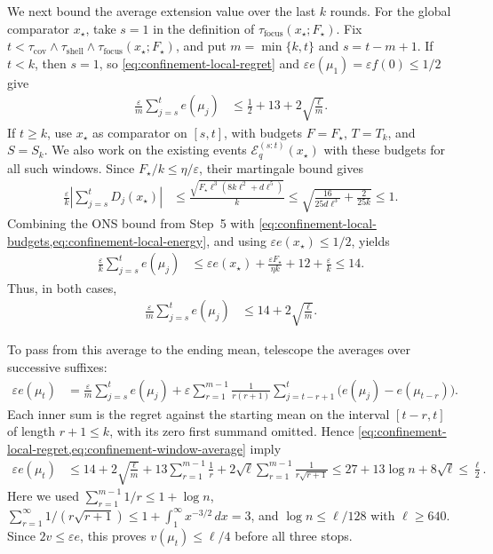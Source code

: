 \documentclass{article}
\newcommand{\1}{\mathbf 1}
\newcommand{\eps}{\varepsilon}
\begin{document}
We next bound the average extension value over the last $k$ rounds.
For the global comparator $x_\star$, take $s=1$ in the definition of
$\tau_{\mathrm{focus}}(x_\star;F_\star)$.
Fix $t<\tau_{\mathrm{cov}}\wedge\tau_{\mathrm{shell}}
    \wedge\tau_{\mathrm{focus}}(x_\star;F_\star)$, and put
$m=\min\{k,t\}$ and $s=t-m+1$.
If $t<k$, then $s=1$, so \eqref{eq:confinement-local-regret} and
$\eps e(\mu_1)=\eps f(0)\leq1/2$ give
\begin{align}
    \frac{\eps}{m}\sum_{j=s}^{t}e(\mu_j)
     & \leq\frac12+13+2\sqrt{\frac{\ell}{m}}.
\end{align}
If $t\geq k$, use $x_\star$ as comparator on $[s,t]$, with budgets
$F=F_\star$, $T=T_k$, and $S=S_k$.
We also work on the existing events
$\mathcal E_{q}^{(s:t)}(x_\star)$ with these budgets for all such windows.
Since $F_\star/k\leq\eta/\eps$, their martingale bound gives
\begin{align}
    \frac{\eps}{k}\left|\sum_{j=s}^{t}D_j(x_\star)\right|
     & \leq\frac{\sqrt{F_\star\ell^3(8k\ell^2+d\ell^5)}}{k}
    \leq\sqrt{\frac{16}{25d\ell^3}+\frac{2}{25k}}
    \leq1.
\end{align}
Combining the ONS bound from Step~5 with
\cref{eq:confinement-local-budgets,eq:confinement-local-energy}, and using
$\eps e(x_\star)\leq1/2$, yields
\begin{align}
    \frac{\eps}{k}\sum_{j=s}^{t}e(\mu_j)
     & \leq\eps e(x_\star)+\frac{\eps F_\star}{\eta k}
    +12+\frac{\eps}{k}
    \leq14.
\end{align}
Thus, in both cases,
\begin{align}
    \frac{\eps}{m}\sum_{j=s}^{t}e(\mu_j)
     & \leq14+2\sqrt{\frac{\ell}{m}}.
    \label{eq:confinement-window-average}
\end{align}

To pass from this average to the ending mean, telescope the averages
over successive suffixes:
\begin{align}
    \eps e(\mu_t)
     & =\frac{\eps}{m}\sum_{j=s}^{t}e(\mu_j)
    +\eps\sum_{r=1}^{m-1}\frac{1}{r(r+1)}
    \sum_{j=t-r+1}^{t}\bigl(e(\mu_j)-e(\mu_{t-r})\bigr).
\end{align}
Each inner sum is the regret against the starting mean on the interval
$[t-r,t]$ of length $r+1\leq k$, with its zero first summand omitted.
Hence \cref{eq:confinement-local-regret,eq:confinement-window-average} imply
\begin{align}
    \eps e(\mu_t)
     & \leq14+2\sqrt{\frac{\ell}{m}}
    +13\sum_{r=1}^{m-1}\frac1r
    +2\sqrt\ell\sum_{r=1}^{m-1}\frac{1}{r\sqrt{r+1}}
    \leq27+13\log n+8\sqrt\ell
    \leq\frac\ell2.
    \label{eq:confinement-pointwise-extension}
\end{align}
Here we used $\sum_{r=1}^{m-1}1/r\leq1+\log n$,
$\sum_{r=1}^{\infty}1/(r\sqrt{r+1})
    \leq1+\int_1^\infty x^{-3/2}\,dx=3$,
and $\log n\leq\ell/128$ with $\ell\geq640$.
Since $2v\leq\eps e$, this proves $v(\mu_t)\leq\ell/4$ before all three stops.
\end{document}
